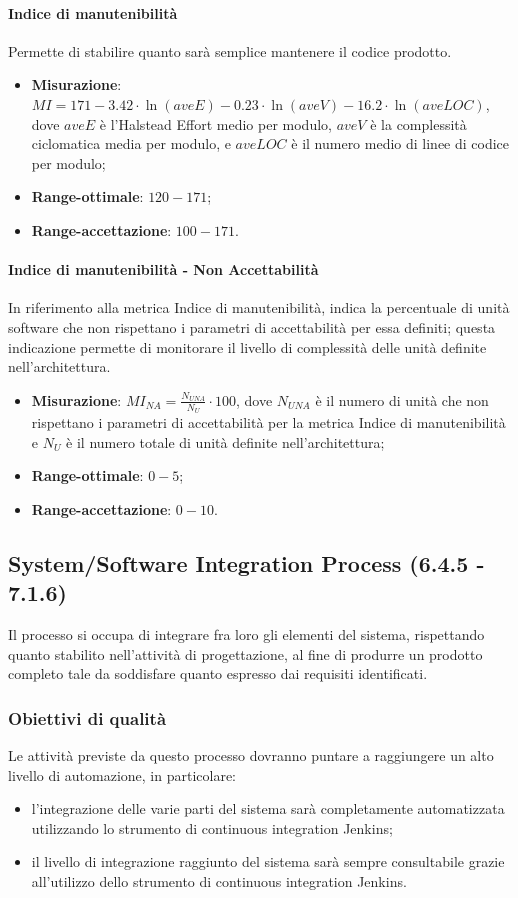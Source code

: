 \paragraph{Indice di manutenibilità}
\label{indMan}
Permette di stabilire quanto sarà semplice mantenere il codice prodotto.
\begin{itemize}
\item \textbf{Misurazione}: $MI = 171 - 3.42 \cdot \ln(aveE) - 0.23 \cdot \ln(aveV) - 16.2 \cdot \ln(aveLOC)$, dove $aveE$ è l'Halstead Effort medio per modulo, $aveV$ è la complessità ciclomatica media per modulo, e $aveLOC$ è il numero medio di linee di codice per modulo;
\item \textbf{Range-ottimale}: $120 - 171$;
\item \textbf{Range-accettazione}: $100 - 171$.
\end{itemize}
\paragraph{Indice di manutenibilità - Non Accettabilità}
\label{indManNA}
In riferimento alla metrica Indice di manutenibilità, indica la percentuale di unità software che non rispettano i parametri di accettabilità per essa definiti; questa indicazione permette di monitorare il livello di complessità delle unità definite nell'architettura.
\begin{itemize}
\item \textbf{Misurazione}: $MI_{NA}=\frac{N_{UNA}}{N_{U}} \cdot 100$, dove $N_{UNA}$ è il numero di unità che non rispettano i parametri di accettabilità per la metrica Indice di manutenibilità e $N_{U}$ è il numero totale di unità definite nell'architettura;
\item \textbf{Range-ottimale}: $0 - 5$;
\item \textbf{Range-accettazione}: $0 - 10$.
\end{itemize}

\subsection{System/Software Integration Process (6.4.5 - 7.1.6)}
\label{sySoIntegration}
Il processo si occupa di integrare fra loro gli elementi del sistema, rispettando quanto stabilito nell'attività di progettazione, al fine di produrre un prodotto completo tale da soddisfare quanto espresso dai requisiti identificati.
\subsubsection{Obiettivi di qualità}
Le attività previste da questo processo dovranno puntare a raggiungere un alto livello di automazione, in particolare:
\begin{itemize}
\item l'integrazione delle varie parti del sistema sarà completamente automatizzata utilizzando lo strumento di continuous integration Jenkins;
\item il livello di integrazione raggiunto del sistema sarà sempre consultabile grazie all'utilizzo dello strumento di continuous integration Jenkins.
\end{itemize}
